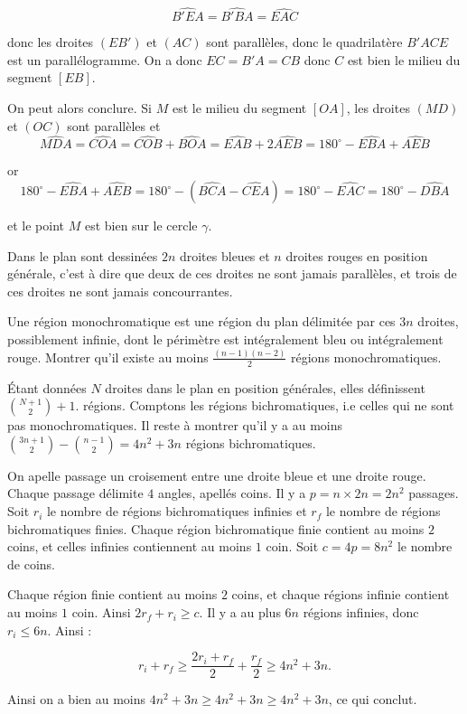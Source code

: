 \begin{sol}
\[\widehat{B'EA}=\widehat{B'BA}=\widehat{EAC}\]

donc les droites $(EB')$ et $(AC)$ sont parallèles, donc le quadrilatère $B'ACE$ est un parallélogramme. On a donc $EC=B'A=CB$ donc $C$ est bien le milieu du segment $[EB]$.

On peut alors conclure. Si $M$ est le milieu du segment $[OA]$, les droites $(MD)$ et $(OC)$ sont parallèles et 
\[\widehat{MDA}=\widehat{COA}=\widehat{COB}+\widehat{BOA}=\widehat{EAB}+2\widehat{AEB}= 180^\circ-\widehat{EBA}+\widehat{AEB}\]

or
\[180^\circ-\widehat{EBA}+\widehat{AEB}= 180^\circ-(\widehat{BCA}-\widehat{CEA})= 180^\circ- \widehat{EAC}= 180^\circ-\widehat{DBA}\]

et le point $M$ est bien sur le cercle $\gamma$.
\end{sol}


\begin{exo}
Dans le plan sont dessinées $2n$ droites bleues et $n$ droites rouges en position générale, c'est à dire que deux de ces droites ne sont jamais parallèles, et trois de ces droites ne sont jamais concourrantes.

Une région monochromatique est une région du plan délimitée par ces $3n$ droites, possiblement infinie, dont le périmètre est intégralement bleu ou intégralement rouge. Montrer qu'il existe au moins $\frac{(n-1)(n-2)}{2}$ régions monochromatiques.
\end{exo}
\begin{sol}
Étant données $N$ droites dans le plan en position générales, elles définissent $\binom{N+1}{2}+1$. régions. Comptons les régions bichromatiques, i.e celles qui ne sont pas monochromatiques. Il reste à montrer qu'il y a au moins $\binom{3n+1}{2}-\binom{n-1}{2}=4n^2+3n$ régions bichromatiques.

\medskip

On apelle passage un croisement entre une droite bleue et une droite rouge. Chaque passage délimite $4$ angles, apellés coins. Il y a $p=n\times 2n=2n^2$ passages. Soit $r_i$ le nombre de régions bichromatiques infinies et $r_f$ le nombre de régions bichromatiques finies. Chaque région bichromatique finie contient au moins $2$ coins, et celles infinies contiennent au moins $1$ coin. Soit $c=4p=8n^2$ le nombre de coins. 

\medskip

Chaque région finie contient au moins $2$ coins, et chaque régions infinie contient au moins $1$ coin. Ainsi $2r_f+r_i\geq c$. Il y a au plus $6n$ régions infinies, donc $r_i\leq 6n$. Ainsi :

$$r_i+r_f\geq \frac{2r_i+r_f}{2}+\frac{r_f}{2}\geq 4n^2+3n.$$

Ainsi on a bien au moins $4n^2+3n\geq 4n^2+3n\geq 4n^2+3n$, ce qui conclut.
\end{sol}
